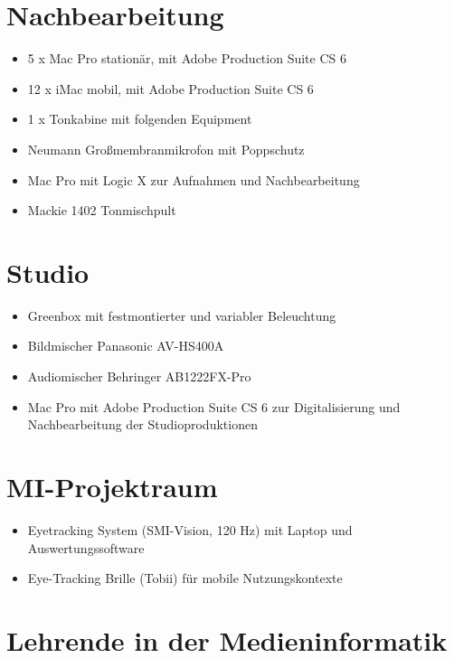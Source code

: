 \section{Nachbearbeitung}\label{nachbearbeitung}

\begin{itemize}
\item
  5 x Mac Pro stationär, mit Adobe Production Suite CS 6
\item
  12 x iMac mobil, mit Adobe Production Suite CS 6
\item
  1 x Tonkabine mit folgenden Equipment
\item
  Neumann Großmembranmikrofon mit Poppschutz
\item
  Mac Pro mit Logic X zur Aufnahmen und Nachbearbeitung
\item
  Mackie 1402 Tonmischpult
\end{itemize}

\section{Studio}\label{studio}

\begin{itemize}
\tightlist
\item
  Greenbox mit festmontierter und variabler Beleuchtung
\item
  Bildmischer Panasonic AV-HS400A
\item
  Audiomischer Behringer AB1222FX-Pro
\item
  Mac Pro mit Adobe Production Suite CS 6 zur Digitalisierung und
  Nachbearbeitung der Studioproduktionen
\end{itemize}

\section{MI-Projektraum}\label{mi-projektraum}

\begin{itemize}
\tightlist
\item
  Eyetracking System (SMI-Vision, 120 Hz) mit Laptop und
  Auswertungssoftware
\item
  Eye-Tracking Brille (Tobii) für mobile Nutzungskontexte
\end{itemize}

\section{Lehrende in der
Medieninformatik}\label{lehrende-in-der-medieninformatik}

